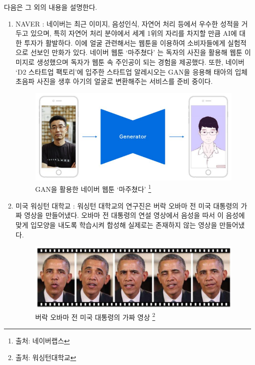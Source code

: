 \documentclass{oblivoir}
\begin{document}
다음은 그 외의 내용을 설명한다.
\begin{enumerate}%

\item NAVER : 네이버는 최근 이미지, 음성인식, 자연어 처리 등에서 우수한 성적을 거두고 있으며, 특히 자연어 처리 분야에서 세계 1위의 자리를 차지할 만큼 AI에 대한 투자가 활발하다. 이에 얼굴 관련해서는 웹툰을 이용하여 소비자들에게 실험적으로 선보인 만화가 있다. 네이버 웹툰 ‘마주쳤다’ 는 독자의 사진을 활용해 웹툰 이미지로 생성했으며 독자가 웹툰 속 주인공이 되는 경험을 제공했다. 또한, 네이버 ‘D2 스타트업 팩토리’에 입주한 스타트업 알레시오는 GAN을 응용해 태아의 입체 초음파 사진을 생후 아기의 얼굴로 변환해주는 서비스를 준비 중이다.

\begin{figure}[h!]
    \centering
      \includegraphics{pic/chp1/imgnaver}
    \caption{ GAN을 활용한 네이버 웹툰 ‘마주쳤다’ \protect\footnote{출처: 네이버랩스}}
\end{figure}


\item 미국 워싱턴 대학교 : 워싱턴 대학교의 연구진은 버락 오바마 전 미국 대통령의 가짜 영상을 만들어냈다. 오바마 전 대통령의 연설 영상에서 음성을 따서 이 음성에 맞게 입모양을 내도록 학습시켜 합성해 실제로는 존재하지 않는 영상을 만들어냈다. 

\begin{figure}[h!]
    \centering
      \includegraphics{pic/chp1/img612}
    \caption{  버락 오바마 전 미국 대통령의 가짜 영상 \protect\footnote{출처: 워싱턴대학교}}
\end{figure}



\end{enumerate}
\end{document}
